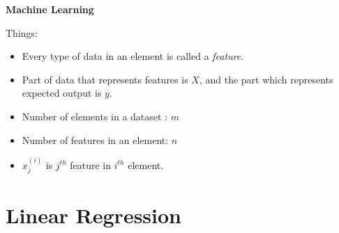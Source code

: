 \documentclass{article}
\begin{document}
\color{black}
\begin{center}
	\LARGE \textbf{Machine Learning}\\
	\vspace{20pt}
\end{center}
\tableofcontents
\large
\vfill
Things:
\begin{itemize}
	\item Every type of data in an element is called a \textit{feature}.
	\item Part of data that represents features is $X$, and the part which represents expected output is $y$.
	\item Number of elements in a dataset : $m$
	\item Number of features in an element: $n$
	\item $x_j^{(i)}$ is $j^{th}$ feature in $i^{th}$ element.
\end{itemize}
\pagebreak
\section{Linear Regression}
\end{document}
